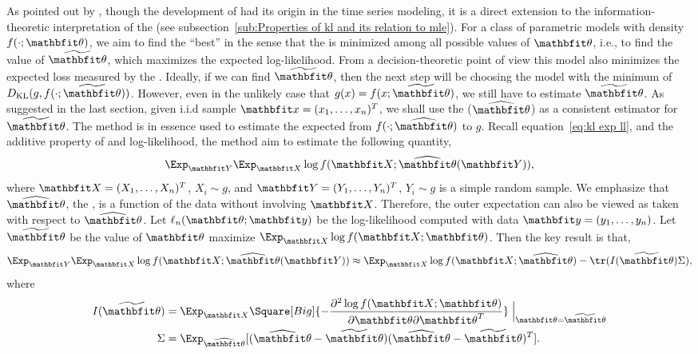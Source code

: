 As pointed out by \textcite{Bozdogan:1987wy}, though the development of \aic had
its origin in the time series modeling, it is a direct extension to the
information-theoretic interpretation of the \mle (see
subsection~\ref{sub:Properties of kl and its relation to mle}). For a class of
parametric models with density $f(\cdot;\bth)$, we aim to find the ``best'' in
the sense that the \kl is minimized among all possible values of $\bth$, i.e.,
to find the value of $\tbth$, which maximizes the expected log-likelihood.
From a decision-theoretic point of view this model also minimizes the expected
loss measured by the \kl \parencite{Akaike:1973uc}. Ideally, if we can find
$\tbth$, then the next step will be choosing the model with the minimum of
$D_{\mathrm{KL}}(g,f(\cdot;\tbth))$. However, even in the unlikely case that
$g(x) = f(x;\tbth)$, we still have to estimate $\tbth$. As suggested in the
last section, given i.i.d sample $\bfx = (x_1,\dots,x_n)^T$, we shall use the
\mle ($\hbth$) as a consistent estimator for $\tbth$. The \aic method is in
essence used to estimate the expected \kl from $f(\cdot; \hbth)$ to $g$.
Recall equation~\eqref{eq:kl exp ll}, and the additive property of \kl and
log-likelihood, the \aic method aim to estimate the following quantity,
\begin{equation}
  \Exp_{\bfY}\Exp_{\bfX}\log f(\bfX;\hbth(\bfY)),
\end{equation}
where $\bfX = (X_1,\dots,X_n)^T$, $X_i \sim g$, and $\bfY =
(Y_1,\dots,Y_n)^T$, $Y_i \sim g$ is a simple random sample. We emphasize that
$\hbth$, the \mle, is a function of the data without involving $\bfX$.
Therefore, the outer expectation can also be viewed as taken with respect to
$\hbth$. Let $\ell_n(\bth;\bfy)$ be the log-likelihood computed with data
$\bfy = (y_1,\dots,y_n)$. Let $\tbth$ be the value of $\bth$ maximize
$\Exp_{\bfX}\log f(\bfX;\bth)$. Then the key result is that,
\begin{equation}
  \Exp_{\bfY}\Exp_{\bfX}\log f(\bfX;\hbth(\bfY))
  \approx \Exp_{\bfX}\log f(\bfX;\hbth) - \tr(I(\tbth)\Sigma),
  \label{eq:aic general}
\end{equation}
where
\begin{align}
  I(\tbth)
  & = \Exp_{\bfX}\Square[Big]{
    -\frac{\partial^2\log f(\bfX;\bth)}{\partial\bth\partial\bth^T}}
  \Bigm|_{\bth=\tbth} \\
  \Sigma &= \Exp_{\hbth}[(\hbth-\tbth)(\hbth-\tbth)^T].
\end{align}

